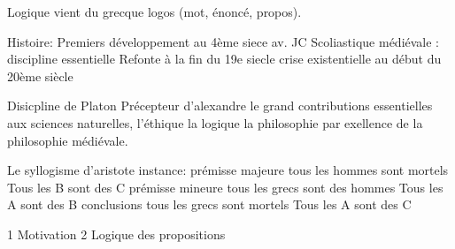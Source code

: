 \documentclass[12pt,a4paper,openany]{report}
\begin{document}
	\setcounter{tocdepth}{2}
	\setcounter{secnumdepth}{3}
	\maketitle

	Logique vient du grecque logos (mot, énoncé, propos).

	Histoire:
		Premiers développement au 4ème siece av. JC
		Scoliastique médiévale : discipline essentielle
		Refonte à la fin du 19e siecle
		crise existentielle au début du 20ème siècle

		Disicpline de Platon
		Précepteur d'alexandre le grand
		contributions essentielles aux sciences naturelles, l'éthique la logique
		la philosophie par exellence de la philosophie médiévale.

		Le syllogisme d'aristote
			instance: 
			prémisse majeure
				tous les hommes sont mortels		Tous les B sont des C
			prémisse mineure					
				tous les grecs sont des hommes		Tous les A sont des B
			conclusions 
				tous les grecs sont mortels			Tous les A sont des C

		1 Motivation
		2 Logique des propositions
\end{document}
